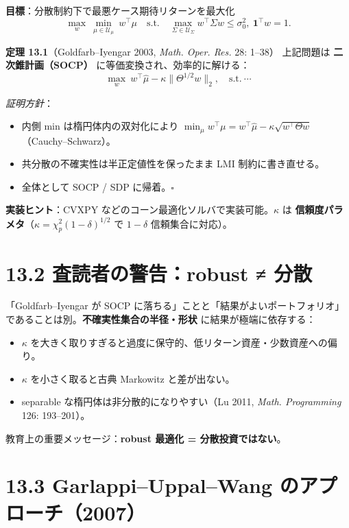 \documentclass[11pt,a4paper]{report}
\begin{document}
\textbf{目標}：分散制約下で最悪ケース期待リターンを最大化 \[ \max_w\ \min_{\mu \in \mathcal{U}_\mu}\ w^\top \mu \quad \text{s.t.}\quad \max_{\Sigma \in \mathcal{U}_\Sigma} w^\top \Sigma w \le \sigma_0^2,\ \mathbf{1}^\top w = 1. \]

\textbf{定理 13.1}（Goldfarb–Iyengar 2003, \emph{Math. Oper. Res.} 28: 1–38） 上記問題は \textbf{二次錐計画（SOCP）} に等価変換され、効率的に解ける： \[ \max_w\ w^\top \hat\mu - \kappa \|\Theta^{1/2} w\|_2,\quad \text{s.t.}\ \cdots \]

\emph{証明方針}：
\begin{itemize}
\item 内側 min は楕円体内の双対化により $\min_\mu w^\top \mu = w^\top \hat\mu - \kappa \sqrt{w^\top \Theta w}$（Cauchy–Schwarz）。
\item 共分散の不確実性は半正定値性を保ったまま LMI 制約に書き直せる。
\item 全体として SOCP / SDP に帰着。$\square$
\end{itemize}

\textbf{実装ヒント}：CVXPY などのコーン最適化ソルバで実装可能。$\kappa$ は \textbf{信頼度パラメタ}（$\kappa = \chi^2_p(1-\delta)^{1/2}$ で $1-\delta$ 信頼集合に対応）。

\section{13.2 査読者の警告：robust ≠ 分散}

「Goldfarb–Iyengar が SOCP に落ちる」ことと「結果がよいポートフォリオ」であることは別。\textbf{不確実性集合の半径・形状} に結果が極端に依存する：

\begin{itemize}
\item $\kappa$ を大きく取りすぎると過度に保守的、低リターン資産・少数資産への偏り。
\item $\kappa$ を小さく取ると古典 Markowitz と差が出ない。
\item separable な楕円体は非分散的になりやすい（Lu 2011, \emph{Math. Programming} 126: 193–201）。
\end{itemize}

教育上の重要メッセージ：\textbf{robust 最適化 = 分散投資ではない}。

\section{13.3 Garlappi–Uppal–Wang のアプローチ（2007）}
\end{document}
